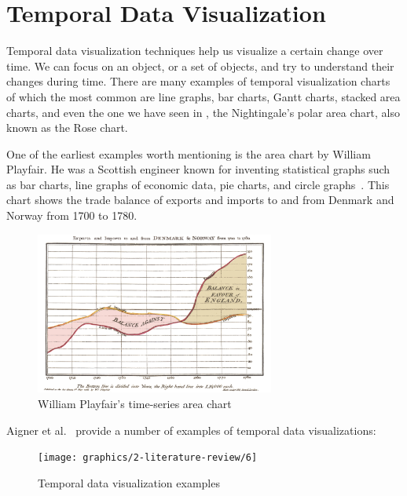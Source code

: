 \section{Temporal Data Visualization}\label{sec:temporal-data-visualization}

Temporal data visualization techniques help us visualize a certain change over time.
We can focus on an object, or a set of objects, and try to understand their changes during time.
There are many examples of temporal visualization charts of which the most common are line graphs, bar charts,
Gantt charts, stacked area charts, and even the one we have seen in , the Nightingale’s
polar area chart, also known as the Rose chart.

One of the earliest examples worth mentioning is the area chart by William Playfair. He was a Scottish engineer
known for inventing statistical graphs such as bar charts, line graphs of economic data, pie charts, and circle
graphs~\citep{friendly2001milestones}. This chart shows the trade balance of exports and imports to and from Denmark and
Norway from 1700 to 1780.

\begin{figure}[hbt!]
    \begin{center}
        \includegraphics[width=0.7\textwidth]{graphics/2-literature-review/5}
    \end{center}
    \caption{William Playfair's time-series area chart~\citep{playfair1801commercial}}
    \label{fig:figure2.5}
\end{figure}

Aigner et al.~\citep{aigner2007visualizing} provide a number of examples of temporal data visualizations:

\begin{figure}[hbt!]
    \begin{center}
        \texttt{[image: graphics/2-literature-review/6]}
    \end{center}
    \caption{Temporal data visualization examples}
    \label{fig:figure2.6}
\end{figure}

